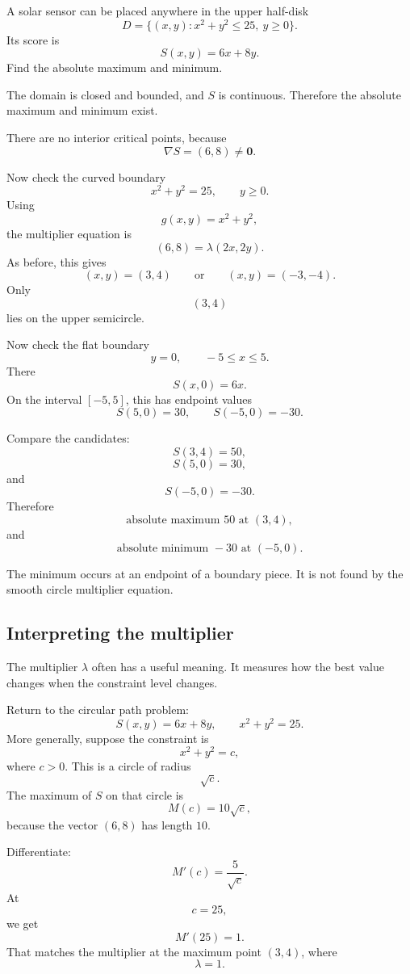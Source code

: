 \begin{example}
A solar sensor can be placed anywhere in the upper half-disk
\[
    D=\{(x,y):x^2+y^2\le25,\ y\ge0\}.
\]
Its score is
\[
    S(x,y)=6x+8y.
\]
Find the absolute maximum and minimum.

The domain is closed and bounded, and \(S\) is continuous.  Therefore the absolute
maximum and minimum exist.

There are no interior critical points, because
\[
    \nabla S=(6,8)\ne\mathbf 0.
\]

Now check the curved boundary
\[
    x^2+y^2=25,
    \qquad
    y\ge0.
\]
Using
\[
    g(x,y)=x^2+y^2,
\]
the multiplier equation is
\[
    (6,8)=\lambda(2x,2y).
\]
As before, this gives
\[
    (x,y)=(3,4)
    \qquad\text{or}\qquad
    (x,y)=(-3,-4).
\]
Only
\[
    (3,4)
\]
lies on the upper semicircle.

Now check the flat boundary
\[
    y=0,
    \qquad
    -5\le x\le5.
\]
There
\[
    S(x,0)=6x.
\]
On the interval \([-5,5]\), this has endpoint values
\[
    S(5,0)=30,
    \qquad
    S(-5,0)=-30.
\]

Compare the candidates:
\[
    S(3,4)=50,
\]
\[
    S(5,0)=30,
\]
and
\[
    S(-5,0)=-30.
\]
Therefore
\[
\boxed{
    \text{absolute maximum }50\text{ at }(3,4),
}
\]
and
\[
\boxed{
    \text{absolute minimum }-30\text{ at }(-5,0).
}
\]

The minimum occurs at an endpoint of a boundary piece.  It is not found by the smooth
circle multiplier equation.
\end{example}

\subsection{Interpreting the multiplier}

The multiplier \(\lambda\) often has a useful meaning.  It measures how the best value
changes when the constraint level changes.

Return to the circular path problem:
\[
    S(x,y)=6x+8y,
    \qquad
    x^2+y^2=25.
\]
More generally, suppose the constraint is
\[
    x^2+y^2=c,
\]
where \(c>0\).  This is a circle of radius
\[
    \sqrt c.
\]
The maximum of \(S\) on that circle is
\[
    M(c)=10\sqrt c,
\]
because the vector \((6,8)\) has length \(10\).

Differentiate:
\[
    M'(c)=\frac{5}{\sqrt c}.
\]
At
\[
    c=25,
\]
we get
\[
    M'(25)=1.
\]
That matches the multiplier at the maximum point \((3,4)\), where
\[
    \lambda=1.
\]

